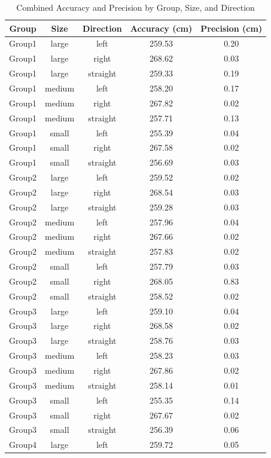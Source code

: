 \begin{table}[H]
\centering
\caption{Combined Accuracy and Precision by Group, Size, and Direction}
\label{tab:combined_stats}
\begin{tabular}{|c|c|c|c|c|}
\hline
Group & Size & Direction & Accuracy (cm) & Precision (cm) \\
\hline
Group1 & large & left & 259.53 & 0.20 \\
Group1 & large & right & 268.62 & 0.03 \\
Group1 & large & straight & 259.33 & 0.19 \\
Group1 & medium & left & 258.20 & 0.17 \\
Group1 & medium & right & 267.82 & 0.02 \\
Group1 & medium & straight & 257.71 & 0.13 \\
Group1 & small & left & 255.39 & 0.04 \\
Group1 & small & right & 267.58 & 0.02 \\
Group1 & small & straight & 256.69 & 0.03 \\
Group2 & large & left & 259.52 & 0.02 \\
Group2 & large & right & 268.54 & 0.03 \\
Group2 & large & straight & 259.28 & 0.03 \\
Group2 & medium & left & 257.96 & 0.04 \\
Group2 & medium & right & 267.66 & 0.02 \\
Group2 & medium & straight & 257.83 & 0.02 \\
Group2 & small & left & 257.79 & 0.03 \\
Group2 & small & right & 268.05 & 0.83 \\
Group2 & small & straight & 258.52 & 0.02 \\
Group3 & large & left & 259.10 & 0.04 \\
Group3 & large & right & 268.58 & 0.02 \\
Group3 & large & straight & 258.76 & 0.03 \\
Group3 & medium & left & 258.23 & 0.03 \\
Group3 & medium & right & 267.86 & 0.02 \\
Group3 & medium & straight & 258.14 & 0.01 \\
Group3 & small & left & 255.35 & 0.14 \\
Group3 & small & right & 267.67 & 0.02 \\
Group3 & small & straight & 256.39 & 0.06 \\
Group4 & large & left & 259.72 & 0.05 \\

\end{tabular}
\end{table}
